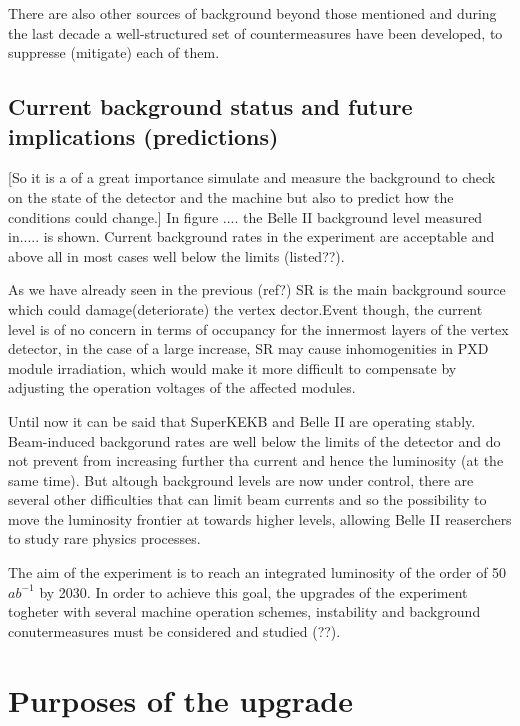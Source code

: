 There are also other sources of background beyond those mentioned and during the last decade a well-structured set of countermeasures have been developed, to suppresse (mitigate) each of them.

\subsection{Current background status and future implications (predictions)}

[So it is a of a great importance simulate and measure the background to check on the state of the detector and the machine but also to predict how the conditions could change.]
In figure .... the Belle II background level measured in..... is shown. Current background rates in the experiment are acceptable and above all in most cases well below the limits (listed??). 

As we have already seen in the previous (ref?) SR is the main background source which could  damage(deteriorate) the vertex dector.Event though, the current level is of no concern in terms of occupancy for the innermost layers of the vertex detector, in the case of a large increase, SR may cause inhomogenities in PXD module irradiation, which would make it more difficult to compensate by adjusting the operation voltages of the affected modules.


Until now it can be said that SuperKEKB and Belle II are operating stably. Beam-induced backgorund rates are well below the limits of the detector and do not prevent from increasing further tha current and hence the luminosity (at the same time).  
But altough background levels are now under control, there are several other difficulties that can limit beam currents and so the possibility to move the luminosity frontier at towards higher levels, allowing Belle II reaserchers to study rare physics processes. 

The aim of the experiment is to reach an integrated luminosity of the order of 50 $ab^{-1}$ by 2030. In order to achieve this goal, the upgrades of the experiment togheter with several machine operation schemes, instability and background conutermeasures must be considered and studied (??).


\section{Purposes of the upgrade}

